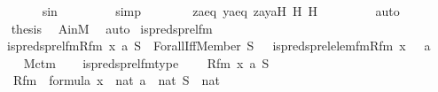 \begin{isabellebody}
\ \ \ \ \ \ \isamarkupfalse%
\ sin\ \isanewline
\ \ \ \ \ \ \isamarkupfalse%
\ simp\isanewline
\ \ \ \ \ \ \isamarkupfalse%
\ zaeq\ yaeq\ zayaH\ H{}\ H{}\ \isanewline
\ \ \ \ \ \ \isamarkupfalse%
\ auto\isanewline
\ \ \isamarkupfalse%
\isanewline
\isanewline
\ \ \isamarkupfalse%
\ \isamarkupfalse%
\ {\isacharquery}{\kern0pt}thesis\ \isamarkupfalse%
\ AinM\ \isamarkupfalse%
\ auto\isanewline
{}\isamarkupfalse%
%
\endisatagproof
{\isafoldproof}%
%
\isadelimproof
\isanewline
%
\endisadelimproof
\isanewline
{}\isamarkupfalse%
\isanewline
\isanewline
{}\isamarkupfalse%
\ is{\isacharunderscore}{\kern0pt}preds{\isacharunderscore}{\kern0pt}prel{\isacharunderscore}{\kern0pt}fm\ \ \isanewline
\ \ {\isachardoublequoteopen}is{\isacharunderscore}{\kern0pt}preds{\isacharunderscore}{\kern0pt}prel{\isacharunderscore}{\kern0pt}fm{\isacharparenleft}{\kern0pt}Rfm{\isacharcomma}{\kern0pt}\ x{\isacharcomma}{\kern0pt}\ a{\isacharcomma}{\kern0pt}\ S{\isacharparenright}{\kern0pt}\ {\isasymequiv}\ Forall{\isacharparenleft}{\kern0pt}Iff{\isacharparenleft}{\kern0pt}Member{\isacharparenleft}{\kern0pt}{}{\isacharcomma}{\kern0pt}\ S\ {\isacharhash}{\kern0pt}{\isacharplus}{\kern0pt}\ {}{\isacharparenright}{\kern0pt}{\isacharcomma}{\kern0pt}\ is{\isacharunderscore}{\kern0pt}preds{\isacharunderscore}{\kern0pt}prel{\isacharunderscore}{\kern0pt}elem{\isacharunderscore}{\kern0pt}fm{\isacharparenleft}{\kern0pt}Rfm{\isacharcomma}{\kern0pt}\ x\ {\isacharhash}{\kern0pt}{\isacharplus}{\kern0pt}\ {}{\isacharcomma}{\kern0pt}\ a\ {\isacharhash}{\kern0pt}{\isacharplus}{\kern0pt}\ {}{\isacharcomma}{\kern0pt}\ {}{\isacharparenright}{\kern0pt}{\isacharparenright}{\kern0pt}{\isacharparenright}{\kern0pt}{\isachardoublequoteclose}\ \isanewline
\isanewline
{}\isamarkupfalse%
\ M{\isacharunderscore}{\kern0pt}ctm\ \isanewline
{}\ \isanewline
\isanewline
{}\isamarkupfalse%
\ is{\isacharunderscore}{\kern0pt}preds{\isacharunderscore}{\kern0pt}prel{\isacharunderscore}{\kern0pt}fm{\isacharunderscore}{\kern0pt}type\ {\isacharcolon}{\kern0pt}\isanewline
\ \ \ Rfm\ x\ a\ S\ \isanewline
\ \ \ {\isachardoublequoteopen}Rfm\ {\isasymin}\ formula{\isachardoublequoteclose}\ {\isachardoublequoteopen}x\ {\isasymin}\ nat{\isachardoublequoteclose}\ {\isachardoublequoteopen}a\ {\isasymin}\ nat{\isachardoublequoteclose}\ {\isachardoublequoteopen}S\ {\isasymin}\ nat{\isachardoublequoteclose}\ \isanewline

\end{isabellebody}
